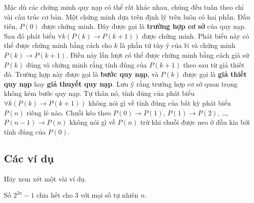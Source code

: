 Mặc dù các chứng minh quy nạp có thể rất khác nhau, chúng đều tuân theo chỉ vài cấu trúc cơ bản. Một chứng minh dựa trên định lý trên luôn có hai phần. Đầu tiên, $P(0)$ được chứng minh. Đây được gọi là \textbf{trường hợp cơ sở} của quy nạp. Sau đó phát biểu $\forall k(P(k) \to P(k+1))$ được chứng minh. Phát biểu này có thể được chứng minh bằng cách cho $k$ là phần tử tùy ý của $\mathbb{N}$ và chứng minh $P(k) \to P(k+1)$. Điều này lần lượt có thể được chứng minh bằng cách giả sử $P(k)$ đúng và chứng minh rằng tính đúng của $P(k+1)$ theo sau từ giả thiết đó. Trường hợp này được gọi là \textbf{bước quy nạp}, và $P(k)$ được gọi là \textbf{giả thiết quy nạp} hay \textbf{giả thuyết quy nạp}. Lưu ý rằng trường hợp cơ sở quan trọng không kém bước quy nạp. Tự thân nó, tính đúng của phát biểu $\forall k(P(k) \to P(k+1))$ không nói gì về tính đúng của bất kỳ phát biểu $P(n)$ riêng lẻ nào. Chuỗi kéo theo $P(0) \to P(1)$, $P(1) \to P(2)$, \ldots, $P(n-1) \to P(n)$ không nói gì về $P(n)$ trừ khi chuỗi được neo ở đầu kia bởi tính đúng của $P(0)$.

\subsection{Các ví dụ}

Hãy xem xét một vài ví dụ.

\begin{theorem}
Số $2^{2n} - 1$ chia hết cho $3$ với mọi số tự nhiên $n$.
\end{theorem}

